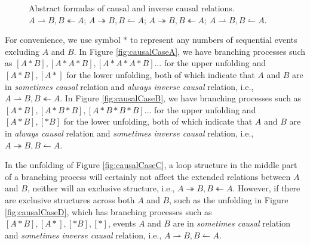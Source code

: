 \documentclass{llncs}
\begin{document}
\begin{figure}[htbp]
{\begin{minipage}[b]{0.45\textwidth}
	\end{minipage}
	\label{fig:causalCaseC}
}
\caption{Abstract formulas of causal and inverse causal relations.  $A\rightharpoonup B, B\twoheadleftarrow A$;  $A\twoheadrightarrow B, B\leftharpoonup A$;  $A\twoheadrightarrow B, B\twoheadleftarrow A$;  $A\rightharpoonup B, B\leftharpoonup A$.\label{fig:causalCases}}
\end{figure}

For convenience, we use symbol $*$ to represent any numbers of sequential events excluding $A$ and $B$. In Figure \ref{fig:causalCaseA}, we have branching processes such as $[A*B],[A*A*B],[A*A*A*B]...$ for the upper unfolding and $[A*B],[A*]$ for the lower unfolding, both of which indicate that $A$ and $B$ are in \textit{sometimes causal} relation and \textit{always inverse causal} relation, i.e., $A\rightharpoonup B,B\twoheadleftarrow A$. In Figure \ref{fig:causalCaseB}, we have branching processes such as $[A*B],[A*B*B],[A*B*B*B]...$ for the upper unfolding and $[A*B],[*B]$ for the lower unfolding, both of which indicate that $A$ and $B$ are in \textit{always causal} relation and \textit{sometimes inverse causal} relation, i.e., $A\twoheadrightarrow B,B\leftharpoonup A$.

In the unfolding of Figure \ref{fig:causalCaseC}, a loop structure in the middle part of a branching process will certainly not affect the extended relations between $A$ and $B$, neither will an exclusive structure, i.e., $A\twoheadrightarrow B,B\twoheadleftarrow A$. However, if there are exclusive structures across both $A$ and $B$, such as the unfolding in Figure \ref{fig:causalCaseD}, which has branching processes such as $[A*B],[A*],[*B],[*]$, events $A$ and $B$ are in \textit{sometimes causal} relation and \textit{sometimes inverse causal} relation, i.e., $A\rightharpoonup B,B\leftharpoonup A$.
\end{document}
